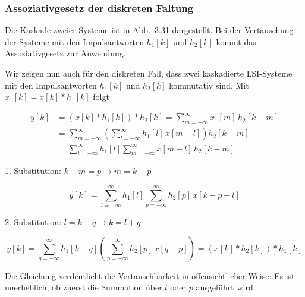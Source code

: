 \subsubsection*{Assoziativgesetz der diskreten Faltung}

Die Kaskade zweier Systeme ist in Abb.\ 3.31 dargestellt. Bei der Vertauschung der Systeme mit den Impulsantworten $h_1[k]$ und $h_2[k]$ kommt das Assoziativgesetz zur Anwendung.

\begin{center}
\end{center}

\begin{beweis}
Wir zeigen nun auch für den diskreten Fall, dass zwei kaskadierte LSI-Systeme mit den Impulsantworten $h_1[k]$ und $h_2[k]$ kommutativ sind. Mit $x_1[k] = x[k] * h_1[k]$ folgt

\begin{align*}
y[k] &= (x[k] * h_1[k]) * h_2[k] = \sum_{m=-\infty}^{\infty} x_1[m]\,h_2[k-m] \\
&= \sum_{m=-\infty}^{\infty} \left(\sum_{l=-\infty}^{\infty} h_1[l]\,x[m-l]\right) h_2[k-m] \\
&= \sum_{l=-\infty}^{\infty} h_1[l] \sum_{m=-\infty}^{\infty} x[m-l]\,h_2[k-m]
\end{align*}

1. Substitution: $k - m = p \to m = k - p$

$$
y[k] = \sum_{l=-\infty}^{\infty} h_1[l] \sum_{p=-\infty}^{\infty} h_2[p]\,x[k - p - l]
$$

2. Substitution: $l = k - q \to k = l + q$

$$
y[k] = \sum_{q=-\infty}^{\infty} h_1[k-q] \left(\sum_{p=-\infty}^{\infty} h_2[p]\,x[q-p]\right) = (x[k] * h_2[k]) * h_1[k]
$$

Die Gleichung verdeutlicht die Vertauschbarkeit in offensichtlicher Weise: Es ist unerheblich, ob zuerst die Summation über $l$ oder $p$ ausgeführt wird.
\end{beweis}


